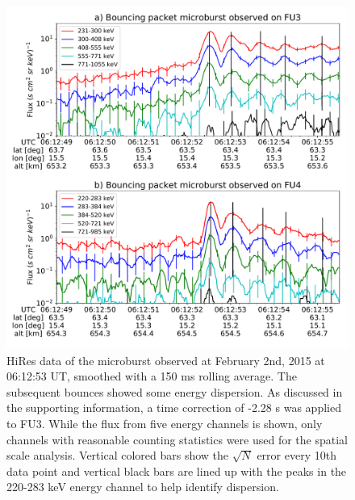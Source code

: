\documentclass[draft, linenumbers]{agujournal}
\begin{document}
\begin{figure}
\includegraphics[width=\textwidth]{hires_plot_log_8pt_smooth_pos_v2.pdf}
\caption{HiRes data of the microburst observed at February 2nd, 2015 at 06:12:53 UT, smoothed with a 150 ms rolling average. The subsequent bounces showed some energy dispersion. As discussed in the supporting information, a time correction of -2.28 s was applied to FU3. While the flux from five energy channels is shown, only channels with reasonable counting statistics were used for the spatial scale analysis. Vertical colored bars show the $\sqrt{N}$ error every 10th data point and vertical black bars are lined up with the peaks in the 220-283 keV energy channel to help identify dispersion.}
\label{hires_plot}
\end{figure}
\end{document}
